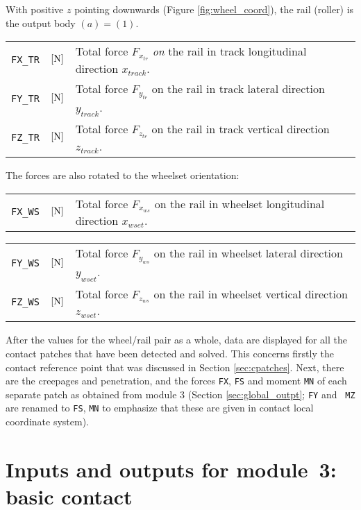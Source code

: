 \documentclass[12pt]{report}
\renewcommand{\magenta}[1]{}
\newenvironment{inputvars}{\vspace{0.4\baselineskip}%

\begin{tabular}{>{\raggedright}p{22mm}p{19mm}p{113mm}}}{
\end{tabular}

}
\newcommand{\inpvar}[3]{{\small\tt #1} & $#2$ & #3 \\[1ex]}
\newcommand{\inpbreak}{\end{inputvars}\begin{inputvars}}
\begin{document}
With positive $z$ pointing downwards (Figure \ref{fig:wheel_coord}), the
rail (roller) is the output body $(a)=(1)$.
\begin{inputvars}
\inpvar{FX\_TR}{\bunit{N}}{Total force $F_{x_{tr}}$ {\em on\/} the rail in
        track longitudinal direction $x_{track}$.}
\inpvar{FY\_TR}{\bunit{N}}{Total force $F_{y_{tr}}$ on the rail in track
        lateral direction $y_{track}$.}
\inpvar{FZ\_TR}{\bunit{N}}{Total force $F_{z_{tr}}$ on the rail in track
        vertical direction $z_{track}$.}
\end{inputvars}
The forces are also rotated to the wheelset orientation:
\begin{inputvars}
\inpvar{FX\_WS}{\bunit{N}}{Total force $F_{x_{ws}}$ on the rail in wheelset
        longitudinal direction $x_{wset}$. \magenta{Input when ${\tt
        F}_1=1$.}}
\inpbreak
\inpvar{FY\_WS}{\bunit{N}}{Total force $F_{y_{ws}}$ on the rail in wheelset
        lateral direction $y_{wset}$.}
\inpvar{FZ\_WS}{\bunit{N}}{Total force $F_{z_{ws}}$ on the rail in wheelset
        vertical direction $z_{wset}$.}
\end{inputvars}
\magenta{
Rail deflections $\delta y_{\defl}, \delta z_{\defl}$ are output when ${\tt
F}_1=3$:
\begin{inputvars}
\inpvar{DYDEFL}{\bunit{mm}}{Lateral shift $\delta y_{\defl}$ of the rail
        with respect to the input position according to the model of
        Equation (\ref{eq:cntc_defl}).}
\inpvar{DZDEFL}{\bunit{mm}}{Vertical shift $\delta z_{\defl}$ of the rail
        with respect to the input position according to the model of
        Equation (\ref{eq:cntc_defl}).}
\end{inputvars}
}
After the values for the wheel/rail pair as a whole, data are displayed for
all the contact patches that have been detected and solved. This concerns
firstly the contact reference point that was discussed in Section
\ref{sec:cpatches}. Next, there are the creepages and penetration, and the
forces {\tt FX}, {\tt FS} and moment {\tt MN} of each separate patch as
obtained from module 3 (Section \ref{sec:global_outpt}; {\tt FY} and {\tt
MZ} are renamed to {\tt FS}, {\tt MN} to emphasize that these are
given in contact local coordinate system).

\color{black}


\chapter{Inputs and outputs for module~3: basic contact}
\label{chp:module3}
\end{document}
